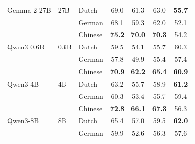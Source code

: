 \begin{table}[t]
\begin{minipage}[t]{0.49\linewidth}
\begin{tabular}{ll l cccc}
\addlinespace[2pt]
Gemma-2-27B & 27B & Dutch & \cellcolor[rgb]{0.802,1.000,0.802} 69.0 & \cellcolor[rgb]{0.857,1.000,0.857} 61.3 & \cellcolor[rgb]{0.828,1.000,0.828} 63.0 & \cellcolor[rgb]{0.883,1.000,0.883} \textbf{55.7} \\
 &  & German & \cellcolor[rgb]{0.811,1.000,0.811} 68.1 & \cellcolor[rgb]{0.883,1.000,0.883} 59.3 & \cellcolor[rgb]{0.841,1.000,0.841} 62.0 & \cellcolor[rgb]{0.957,1.000,0.957} 52.1 \\
 &  & Chinese & \cellcolor[rgb]{0.737,1.000,0.737} \textbf{75.2} & \cellcolor[rgb]{0.748,1.000,0.748} \textbf{70.0} & \cellcolor[rgb]{0.731,1.000,0.731} \textbf{70.3} & \cellcolor[rgb]{0.914,1.000,0.914} 54.2 \\
\addlinespace[2pt]
Qwen3-0.6B & 0.6B & Dutch & \cellcolor[rgb]{0.901,1.000,0.901} 59.5 & \cellcolor[rgb]{0.948,1.000,0.948} 54.1 & \cellcolor[rgb]{0.925,1.000,0.925} 55.7 & \cellcolor[rgb]{0.789,1.000,0.789} 60.3 \\
 &  & German & \cellcolor[rgb]{0.919,1.000,0.919} 57.8 & \cellcolor[rgb]{1.000,0.999,0.999} 49.9 & \cellcolor[rgb]{0.929,1.000,0.929} 55.4 & \cellcolor[rgb]{0.849,1.000,0.849} 57.4 \\
 &  & Chinese & \cellcolor[rgb]{0.782,1.000,0.782} \textbf{70.9} & \cellcolor[rgb]{0.846,1.000,0.846} \textbf{62.2} & \cellcolor[rgb]{0.796,1.000,0.796} \textbf{65.4} & \cellcolor[rgb]{0.777,1.000,0.777} \textbf{60.9} \\
\addlinespace[2pt]
Qwen3-4B & 4B & Dutch & \cellcolor[rgb]{0.862,1.000,0.862} 63.2 & \cellcolor[rgb]{0.928,1.000,0.928} 55.7 & \cellcolor[rgb]{0.882,1.000,0.882} 58.9 & \cellcolor[rgb]{0.771,1.000,0.771} \textbf{61.2} \\
 &  & German & \cellcolor[rgb]{0.893,1.000,0.893} 60.3 & \cellcolor[rgb]{0.957,1.000,0.957} 53.4 & \cellcolor[rgb]{0.925,1.000,0.925} 55.7 & \cellcolor[rgb]{0.808,1.000,0.808} 59.4 \\
 &  & Chinese & \cellcolor[rgb]{0.762,1.000,0.762} \textbf{72.8} & \cellcolor[rgb]{0.797,1.000,0.797} \textbf{66.1} & \cellcolor[rgb]{0.771,1.000,0.771} \textbf{67.3} & \cellcolor[rgb]{0.871,1.000,0.871} 56.3 \\
\addlinespace[2pt]
Qwen3-8B & 8B & Dutch & \cellcolor[rgb]{0.839,1.000,0.839} 65.4 & \cellcolor[rgb]{0.912,1.000,0.912} 57.0 & \cellcolor[rgb]{0.874,1.000,0.874} 59.5 & \cellcolor[rgb]{0.755,1.000,0.755} \textbf{62.0} \\
 &  & German & \cellcolor[rgb]{0.897,1.000,0.897} 59.9 & \cellcolor[rgb]{0.967,1.000,0.967} 52.6 & \cellcolor[rgb]{0.917,1.000,0.917} 56.3 & \cellcolor[rgb]{0.845,1.000,0.845} 57.6 \\

\end{tabular}
\end{minipage}
\end{table}
